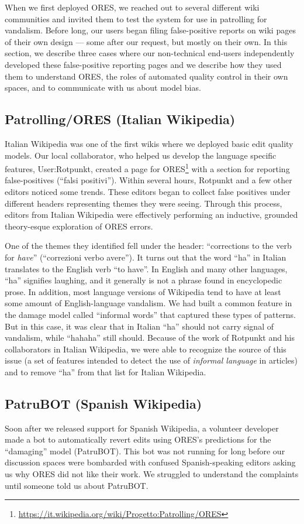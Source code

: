 When we first deployed ORES, we reached out to several different wiki communities and invited them to test the system for use in patrolling for vandalism.  Before long, our users began filing false-positive reports on wiki pages of their own design --- some after our request, but mostly on their own.  In this section, we describe three cases where our non-technical end-users independently developed these false-positive reporting pages and we describe how they used them to understand ORES, the roles of automated quality control in their own spaces, and to communicate with us about model bias.

\subsection{Patrolling/ORES (Italian Wikipedia)}
Italian Wikipedia was one of the first wikis where we deployed basic edit quality models.  Our local collaborator, who helped us develop the language specific features, User:Rotpunkt, created a page for ORES\footnote{\url{https://it.wikipedia.org/wiki/Progetto:Patrolling/ORES}} with a section for reporting false-positives (``falsi positivi'').  Within several hours, Rotpunkt and a few other editors noticed some trends.  These editors began to collect false positives under different headers representing themes they were seeing.  Through this process, editors from Italian Wikipedia were effectively performing an inductive, grounded theory-esque exploration of ORES errors.

One of the themes they identified fell under the header: ``corrections to the verb for \emph{have}'' (``correzioni verbo avere'').  It turns out that the word ``ha'' in Italian translates to the English verb ``to have''.  In English and many other languages, ``ha'' signifies laughing, and it generally is not a phrase found in encyclopedic prose. In addition, most language versions of Wikipedia tend to have at least some amount of English-language vandalism.  We had built a common feature in the damage model called ``informal words'' that captured these types of patterns.  But in this case, it was clear that in Italian ``ha'' should not carry signal of vandalism, while ``hahaha'' still should. Because of the work of Rotpunkt and his collaborators in Italian Wikipedia, we were able to recognize the source of this issue (a set of features intended to detect the use of \emph{informal language} in articles) and to remove ``ha'' from that list for Italian Wikipedia.

\subsection{PatruBOT (Spanish Wikipedia)}
Soon after we released support for Spanish Wikipedia, a volunteer developer made a bot to automatically revert edits using ORES's predictions for the ``damaging'' model (PatruBOT).  This bot was not running for long before our discussion spaces were bombarded with confused Spanish-speaking editors asking us why ORES did not like their work.  We struggled to understand the complaints until someone told us about PatruBOT. 

